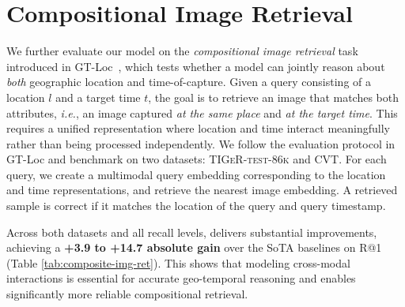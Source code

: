 \vspace{-1em}
\section{Compositional Image Retrieval}
\label{sup:compositional}
We further evaluate our model on the \emph{compositional image retrieval} task introduced in GT-Loc~\cite{Shatwell_2025_ICCV}, which tests whether a model can jointly reason about \emph{both} geographic location and time-of-capture.  
Given a query consisting of a location $l$ and a target time $t$, the goal is to retrieve an image that matches both attributes, \textit{i.e.}, an image captured \emph{at the same place} and \emph{at the target time}.  
This requires a unified representation where location and time interact meaningfully rather than being processed independently.
We follow the evaluation protocol in GT-Loc and benchmark on two datasets: \textsc{TIGeR-test-86k} and \textsc{CVT}.  
For each query, we create a multimodal query embedding corresponding to the location and time representations, and retrieve the nearest image embedding.  
A retrieved sample is correct if it matches the location of the query and query timestamp.

Across both datasets and all recall levels, \tiger delivers substantial improvements, achieving a \textbf{+3.9 to +14.7 absolute gain} over the SoTA baselines on R@1 (Table \ref{tab:composite-img-ret}).  
This shows that modeling cross-modal interactions is essential for accurate geo-temporal reasoning and enables significantly more reliable compositional retrieval.

